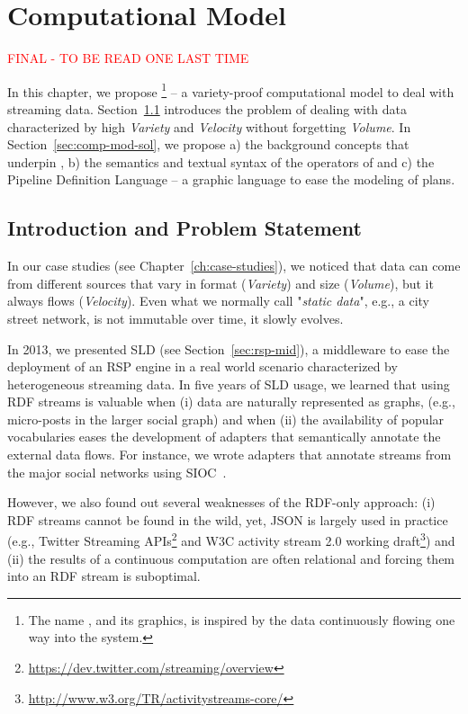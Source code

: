 \chapter{Computational Model}\label{ch:computational}

\textcolor{red}{FINAL - TO BE READ ONE LAST TIME}

In this chapter, we propose \river{}\footnote{The name \river, and its graphics, is inspired by the data continuously flowing one way into the system.} -- a variety-proof computational model to deal with streaming data.
Section~\ref{sec:comp-mod-intro} introduces the problem of dealing with data characterized by high \textit{Variety} and \textit{Velocity} without forgetting \textit{Volume}.
In Section~\ref{sec:comp-mod-sol}, we propose a) the background concepts that underpin \river{}, b) the semantics and textual syntax of the operators of \river{} and c) the Pipeline Definition Language -- a graphic language to ease the modeling of \river{} plans.

\section{Introduction and Problem Statement} \label{sec:comp-mod-intro}
In our case studies (see Chapter~\ref{ch:case-studies}), we noticed that data can come from different sources that vary in format (\textit{Variety}) and size (\textit{Volume}), but it  always flows (\textit{Velocity}). Even what we normally call "\textit{static data}", e.g.,  a city street network, is not immutable over time, it  slowly evolves.

In 2013, we presented SLD (see Section~\ref{sec:rsp-mid}), a middleware to ease the deployment of an RSP engine in a real world scenario characterized by heterogeneous streaming data.
In five years of SLD usage, we learned that using RDF streams is valuable when (i) data are naturally represented as graphs, (e.g., micro-posts in the larger social graph) and when (ii) the availability of popular vocabularies eases the development of adapters that semantically annotate the external data flows.
For instance, we wrote adapters that annotate streams from the major social networks using SIOC~\cite{DBLP:journals/ijwbc/BreslinDHB06}.

However, we also found out several weaknesses of the RDF-only approach: (i) RDF streams cannot be found in the wild, yet, JSON is largely used in practice (e.g., Twitter Streaming APIs\footnote{\url{https://dev.twitter.com/streaming/overview}} and W3C activity stream 2.0 working draft\footnote{\url{http://www.w3.org/TR/activitystreams-core/}}) and (ii) the results of a continuous computation are often relational and forcing them into an RDF stream is suboptimal.

